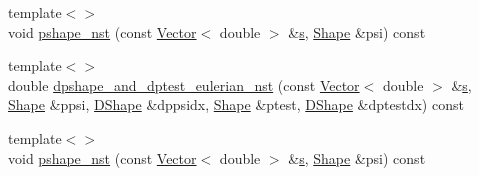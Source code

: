 \begin{DoxyCompactItemize}
\item 
{\footnotesize template$<$$>$ }\\void \hyperlink{classoomph_1_1QTaylorHoodElement_a3638aa1e57ea83073b61f7b4bdd57c80}{pshape\+\_\+nst} (const \hyperlink{classoomph_1_1Vector}{Vector}$<$ double $>$ \&\hyperlink{cfortran_8h_ab7123126e4885ef647dd9c6e3807a21c}{s}, \hyperlink{classoomph_1_1Shape}{Shape} \&psi) const
\item 
{\footnotesize template$<$$>$ }\\double \hyperlink{classoomph_1_1QTaylorHoodElement_ab6e02c9be9e94608bd54b1afe1434d10}{dpshape\+\_\+and\+\_\+dptest\+\_\+eulerian\+\_\+nst} (const \hyperlink{classoomph_1_1Vector}{Vector}$<$ double $>$ \&\hyperlink{cfortran_8h_ab7123126e4885ef647dd9c6e3807a21c}{s}, \hyperlink{classoomph_1_1Shape}{Shape} \&ppsi, \hyperlink{classoomph_1_1DShape}{D\+Shape} \&dppsidx, \hyperlink{classoomph_1_1Shape}{Shape} \&ptest, \hyperlink{classoomph_1_1DShape}{D\+Shape} \&dptestdx) const
\item 
{\footnotesize template$<$$>$ }\\void \hyperlink{classoomph_1_1QTaylorHoodElement_abc75cdb4d6a56f9def855c04b7c912fd}{pshape\+\_\+nst} (const \hyperlink{classoomph_1_1Vector}{Vector}$<$ double $>$ \&\hyperlink{cfortran_8h_ab7123126e4885ef647dd9c6e3807a21c}{s}, \hyperlink{classoomph_1_1Shape}{Shape} \&psi) const
\end{DoxyCompactItemize}
